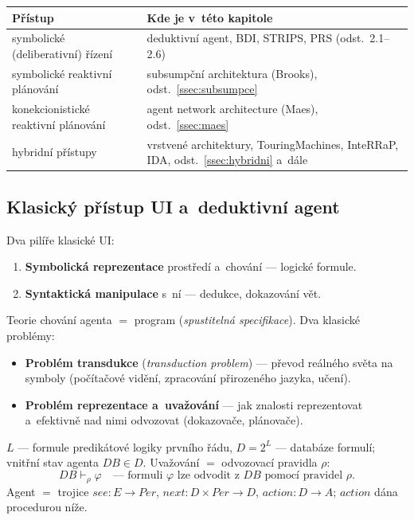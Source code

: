 \documentclass[11pt,a4paper]{article}
\theoremstyle{definition}
\begin{document}
\begin{center}
\small
\begin{tabular}{@{}p{} p{}@{}}
\toprule
\textbf{Přístup} & \textbf{Kde je v~této kapitole} \\
\midrule
symbolické (deliberativní) řízení
  & deduktivní agent, BDI, STRIPS, PRS (odst.\ 2.1--2.6) \\
symbolické reaktivní plánování
  & subsumpční architektura (Brooks), odst.~\ref{ssec:subsumpce} \\
konekcionistické reaktivní plánování
  & agent network architecture (Maes), odst.~\ref{ssec:maes} \\
hybridní přístupy
  & vrstvené architektury, TouringMachines, InteRRaP, IDA, odst.~\ref{ssec:hybridni} a~dále \\
\bottomrule
\end{tabular}
\end{center}
\subsection{Klasický přístup UI a~deduktivní agent}

Dva pilíře klasické UI:
\begin{enumerate}
\item \textbf{Symbolická reprezentace} prostředí a~chování --- logické formule.
\item \textbf{Syntaktická manipulace} s~ní --- dedukce, dokazování vět.
\end{enumerate}
Teorie chování agenta $=$ program (\emph{spustitelná specifikace}). Dva klasické problémy:
\begin{itemize}
\item \textbf{Problém transdukce} (\emph{transduction problem}) --- převod reálného světa na
  symboly (počítačové vidění, zpracování přirozeného jazyka, učení).
\item \textbf{Problém reprezentace a~uvažování} --- jak znalosti reprezentovat a~efektivně nad
  nimi odvozovat (dokazovače, plánovače).
\end{itemize}

\begin{defbox}
$L$ --- formule predikátové logiky prvního řádu, $D = 2^L$ --- databáze formulí; vnitřní stav
agenta $\mathit{DB} \in D$. Uvažování $=$ odvozovací pravidla $\rho$:
\[
\mathit{DB} \vdash_\rho \varphi \quad\text{---\ formuli } \varphi \text{ lze odvodit z } \mathit{DB}
\text{ pomocí pravidel } \rho .
\]
Agent $=$ trojice $\mathit{see} : E \to \mathit{Per}$, $\mathit{next} : D \times \mathit{Per} \to D$,
$\mathit{action} : D \to A$; $\mathit{action}$ dána procedurou níže.
\end{defbox}
\end{document}
